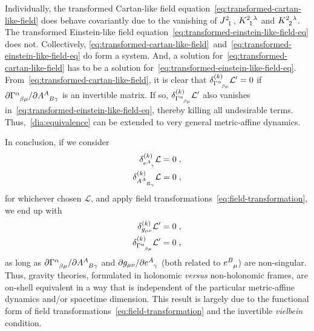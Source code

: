 \documentclass[../../main.tex]{subfiles}
\begin{document}
Individually, the transformed Cartan-like field equation~\eqref{eq:transformed-cartan-like-field} does behave covariantly due to the vanishing of $\tensor{J}{^2_1}$, $\tensor{K}{^2_1^\lambda}$ and $\tensor{K}{^2_2^\lambda}$. The transformed Einstein-like field equation~\eqref{eq:transformed-einstein-like-field-eq} does not. Collectively, \eqref{eq:transformed-cartan-like-field}~and~\eqref{eq:transformed-einstein-like-field-eq} do form a system. And, a solution for~\eqref{eq:transformed-cartan-like-field} has to be a solution for~\eqref{eq:transformed-einstein-like-field-eq}. From~\eqref{eq:transformed-cartan-like-field}, it is clear that $\delta^{(k)}_{\tensor{\Gamma}{^\alpha_{\beta\mu}}}\mathcal{L}'=0$ if $\partial \tensor{\Gamma}{^\alpha_{\beta\mu}} / \partial \tensor{A}{^A_{B\gamma}}$ is an invertible matrix. If so, $\delta^{(k)}_{\tensor{\Gamma}{^\alpha_{\beta\mu}}}\mathcal{L}'$ also vanishes in~\eqref{eq:transformed-einstein-like-field-eq}, thereby killing all undesirable terms. Thus,~\ref{dia:equivalence} can be extended to very general metric-affine dynamics.

In conclusion, if we consider
\begin{subequations}
  \begin{align}
    \delta^{(k)}_{\tensor{e}{^A_\gamma}}\mathcal{L}     & = 0 \;, \\
    \delta^{(k)}_{\tensor{A}{^A_{B_\gamma}}}\mathcal{L} & = 0 \;,
  \end{align}
\end{subequations}
for whichever chosen $\mathcal{L}$, and apply field transformations~\eqref{eq:field-transformation}, we end up with
\begin{subequations}\label{eq:non-standard-field-eq-transf-for-gravity-simplified}
  \begin{align}
    \delta^{(k)}_{g_{\mu\nu}} \mathcal{L}'                          & = 0 \;, \\
    \delta^{(k)}_{\tensor{\Gamma}{^\alpha_{\beta\mu}}} \mathcal{L}' & = 0 \;,
  \end{align}
\end{subequations}
as long as $\partial \tensor{\Gamma}{^\alpha_{\beta\mu}} / \partial \tensor{A}{^A_{B\gamma}}$ and $ \partial g_{ \mu \nu } / \partial \tensor{e}{^A_{\gamma}} $ (both related to $\tensor{e}{^B_\mu}$) are non-singular. Thus, gravity theories, formulated in holonomic \textit{versus} non-holonomic frames, are on-shell equivalent in a way that is independent of the particular metric-affine dynamics and/or spacetime dimension. This result is largely due to the functional form of field transformations~\eqref{eq:field-transformation} and the invertible \textit{vielbein} condition.
\end{document}
